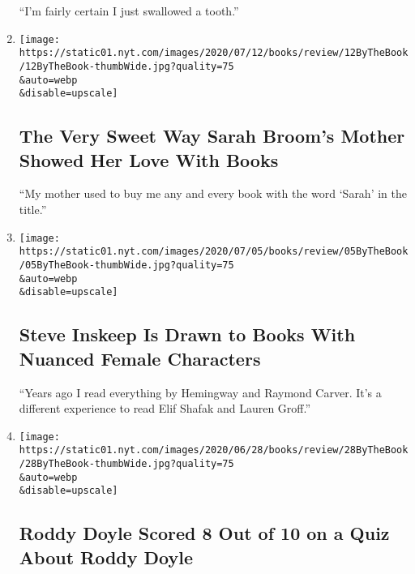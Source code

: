 \begin{enumerate}
  ``I'm fairly certain I just swallowed a tooth.''
\item
  \href{/2020/07/09/books/review/sarah-broom-by-the-book-interview.html}{}

  \texttt{[image: https://static01.nyt.com/images/2020/07/12/books/review/12ByTheBook/12ByTheBook-thumbWide.jpg?quality=75\\\&auto=webp\\\&disable=upscale]}

  \hypertarget{the-very-sweet-way-sarah-brooms-mother-showed-her-love-with-books}{%
  \subsection{The Very Sweet Way Sarah Broom's Mother Showed Her Love
  With
  Books}\label{the-very-sweet-way-sarah-brooms-mother-showed-her-love-with-books}}

  ``My mother used to buy me any and every book with the word `Sarah' in
  the title.''
\item
  \href{/2020/07/02/books/review/steve-inskeep-by-the-book-interview.html}{}

  \texttt{[image: https://static01.nyt.com/images/2020/07/05/books/review/05ByTheBook/05ByTheBook-thumbWide.jpg?quality=75\\\&auto=webp\\\&disable=upscale]}

  \hypertarget{steve-inskeep-is-drawn-to-books-with-nuanced-female-characters}{%
  \subsection{Steve Inskeep Is Drawn to Books With Nuanced Female
  Characters}\label{steve-inskeep-is-drawn-to-books-with-nuanced-female-characters}}

  ``Years ago I read everything by Hemingway and Raymond Carver. It's a
  different experience to read Elif Shafak and Lauren Groff.''
\item
  \href{/2020/06/25/books/review/roddy-doyle-by-the-book-interview.html}{}

  \texttt{[image: https://static01.nyt.com/images/2020/06/28/books/review/28ByTheBook/28ByTheBook-thumbWide.jpg?quality=75\\\&auto=webp\\\&disable=upscale]}

  \hypertarget{roddy-doyle-scored-8-out-of-10-on-a-quiz-about-roddy-doyle}{%
  \subsection{Roddy Doyle Scored 8 Out of 10 on a Quiz About Roddy
  Doyle}\label{roddy-doyle-scored-8-out-of-10-on-a-quiz-about-roddy-doyle}}


\end{enumerate}
